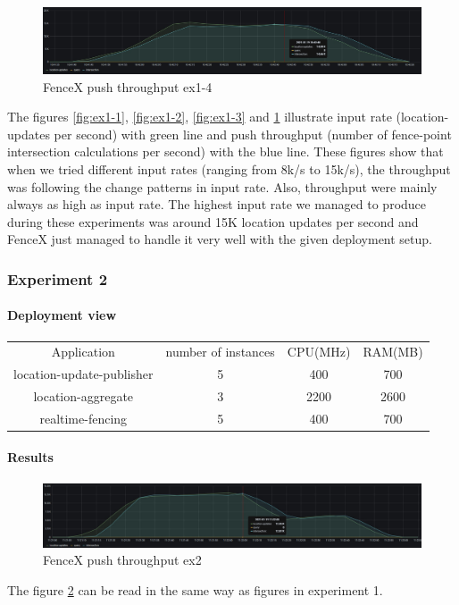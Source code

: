 \documentclass[a4]{report}
\begin{document}
    \begin{figure}[ht]
        \caption{FenceX push throughput ex1-4}
        \label{fig:ex1-4}
        \includegraphics[scale=0.4]{images/evaluation/ex1-benchmarking(23,10).png}
    \end{figure}

    The figures \ref{fig:ex1-1}, \ref{fig:ex1-2}, \ref{fig:ex1-3} and \ref{fig:ex1-4} illustrate input rate
    (location-updates per second) with green line and push throughput (number of fence-point intersection
    calculations per second) with the blue line.
    These figures show that when we tried different input rates (ranging from 8k/s to 15k/s), the throughput was
    following the change patterns in input rate.
    Also, throughput were mainly always as high as input rate.
    The highest input rate we managed to produce during these experiments was around 15K location updates per second
    and FenceX just managed to handle it very well with the given deployment setup.

    \subsubsection{Experiment 2}

    \paragraph{Deployment view}
    \begin{center}
        \begin{tabular}{ c c c c }
            Application               & number of instances & CPU(MHz) & RAM(MB) \\
            location-update-publisher & 5                   & 400      & 700     \\
            location-aggregate        & 3                   & 2200     & 2600    \\
            realtime-fencing          & 5                   & 400      & 700     \\
        \end{tabular}
    \end{center}

    \paragraph{Results}
    \begin{figure}[ht]
        \caption{FenceX push throughput ex2}
        \label{fig:ex2}
        \includegraphics[scale=0.4]{images/evaluation/ex2-benchmarking(24,10).png}
    \end{figure}
    The figure \ref{fig:ex2} can be read in the same way as figures in experiment 1.
\end{document}
